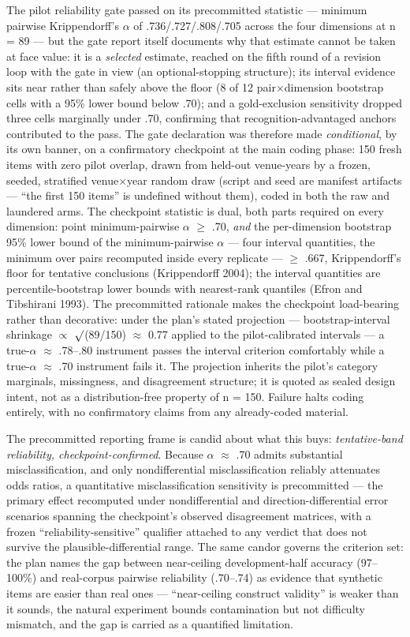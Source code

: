 The pilot reliability gate passed on its precommitted statistic --- minimum pairwise Krippendorff's $\alpha$ of .736/.727/.808/.705 across the four dimensions at n = 89 --- but the gate report itself documents why that estimate cannot be taken at face value: it is a \emph{selected} estimate, reached on the fifth round of a revision loop with the gate in view (an optional-stopping structure); its interval evidence sits near rather than safely above the floor (8 of 12 pair$\times$dimension bootstrap cells with a 95\% lower bound below .70); and a gold-exclusion sensitivity dropped three cells marginally under .70, confirming that recognition-advantaged anchors contributed to the pass. The gate declaration was therefore made \emph{conditional}, by its own banner, on a confirmatory checkpoint at the main coding phase: 150 fresh items with zero pilot overlap, drawn from held-out venue-years by a frozen, seeded, stratified venue$\times$year random draw (script and seed are manifest artifacts --- ``the first 150 items'' is undefined without them), coded in both the raw and laundered arms. The checkpoint statistic is dual, both parts required on every dimension: point minimum-pairwise $\alpha$ $\ge$ .70, \emph{and} the per-dimension bootstrap 95\% lower bound of the minimum-pairwise $\alpha$ --- four interval quantities, the minimum over pairs recomputed inside every replicate --- $\ge$ .667, Krippendorff's floor for tentative conclusions (Krippendorff 2004); the interval quantities are percentile-bootstrap lower bounds with nearest-rank quantiles (Efron and Tibshirani 1993). The precommitted rationale makes the checkpoint load-bearing rather than decorative: under the plan's stated projection --- bootstrap-interval shrinkage $\propto$ $\surd$(89/150) $\approx$ 0.77 applied to the pilot-calibrated intervals --- a true-$\alpha$ $\approx$ .78--.80 instrument passes the interval criterion comfortably while a true-$\alpha$ $\approx$ .70 instrument fails it. The projection inherits the pilot's category marginals, missingness, and disagreement structure; it is quoted as sealed design intent, not as a distribution-free property of n = 150. Failure halts coding entirely, with no confirmatory claims from any already-coded material.

The precommitted reporting frame is candid about what this buys: \emph{tentative-band reliability, checkpoint-confirmed}. Because $\alpha$ $\approx$ .70 admits substantial misclassification, and only nondifferential misclassification reliably attenuates odds ratios, a quantitative misclassification sensitivity is precommitted --- the primary effect recomputed under nondifferential and direction-differential error scenarios spanning the checkpoint's observed disagreement matrices, with a frozen ``reliability-sensitive'' qualifier attached to any verdict that does not survive the plausible-differential range. The same candor governs the criterion set: the plan names the gap between near-ceiling development-half accuracy (97--100\%) and real-corpus pairwise reliability (.70--.74) as evidence that synthetic items are easier than real ones --- ``near-ceiling construct validity'' is weaker than it sounds, the natural experiment bounds contamination but not difficulty mismatch, and the gap is carried as a quantified limitation.

